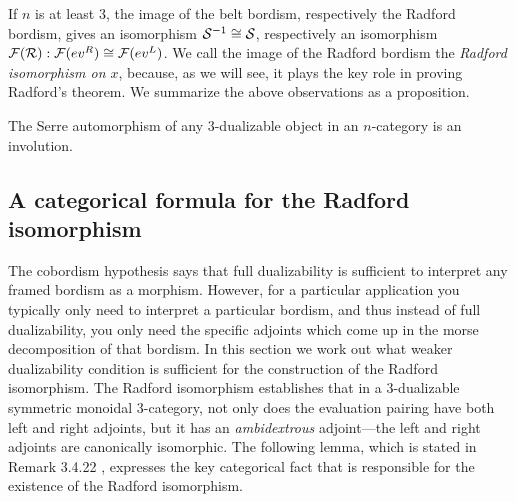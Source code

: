\documentclass{amsart}
\begin{document}
If $n$ is at least 3, the image of the belt bordism, respectively the Radford bordism, gives an isomorphism $\mathcal S^{-1} \cong \mathcal S$, respectively an isomorphism $\mathcal F(\mathcal R): \mathcal F(ev^R) \cong \mathcal F(ev^L)$.
We call the image of the Radford bordism the {\em Radford isomorphism on $x$}, because, as we will see, it plays the key role in proving Radford's theorem. We summarize the above observations as a proposition.

\begin{proposition}
The Serre automorphism of any $3$-dualizable object in an $n$-category is an involution.
\end{proposition}



\subsection{A categorical formula for the Radford isomorphism} 

The cobordism hypothesis says that full dualizability is sufficient to interpret any framed bordism as a morphism.  However, for a particular application you typically only need to interpret a particular bordism, and thus instead of full dualizability, you only need the specific adjoints which come up in the morse decomposition of that bordism.  In this section we work out what weaker dualizability condition is sufficient for the construction of the Radford isomorphism.    The Radford isomorphism establishes that in a 3-dualizable symmetric monoidal 3-category, not only does the evaluation pairing have both left and right adjoints, but it has an {\em ambidextrous} adjoint---the left and right adjoints are canonically isomorphic. 
The following lemma, which is stated in Remark 3.4.22 \cite{lurie-ch}, expresses the key categorical fact that is responsible for the existence of the Radford isomorphism. 
\end{document}
